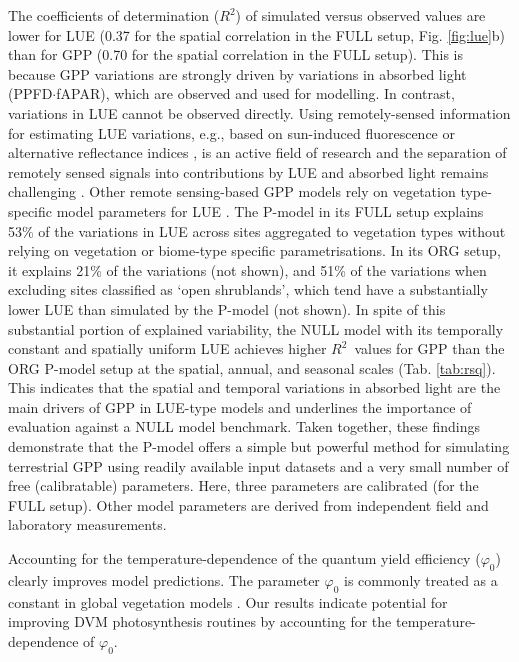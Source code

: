 \documentclass{myreport}
\newcommand{\rsq}{$R^2$}
\begin{document}
The coefficients of determination (\rsq ) of simulated versus observed values are lower for LUE (0.37 for the spatial correlation in the FULL setup, Fig. \ref{fig:lue}b) than for GPP (0.70 for the spatial correlation in the FULL setup). This is because GPP variations are strongly driven by variations in absorbed light (PPFD$\cdot$fAPAR), which are observed and used for modelling. In contrast, variations in LUE cannot be observed directly. Using remotely-sensed information for estimating LUE variations, e.g., based on sun-induced fluorescence \citep{frankenberg18, li18gcb, ryu19rse} or alternative reflectance indices \citep{gamon92, gamon16pnas, Badgley2017-tw}, is an active field of research and the separation of remotely sensed signals into contributions by LUE and absorbed light remains challenging \citep{porcarcastell14, ryu19rse}. Other remote sensing-based GPP models rely on vegetation type-specific model parameters for LUE \citep{Zhang2017-yr, running04, jiang16rse}. The P-model in its FULL setup explains 53\% of the variations in LUE across sites aggregated to vegetation types without relying on vegetation or biome-type specific parametrisations. In its ORG setup, it explains 21\% of the variations (not shown), and 51\% of the variations when excluding sites classified as `open shrublands', which tend have a substantially lower LUE than simulated by the P-model (not shown). In spite of this substantial portion of explained variability, the NULL model with its temporally constant and spatially uniform LUE achieves higher \rsq\ values for GPP than the ORG P-model setup at the spatial, annual, and seasonal scales (Tab. \ref{tab:rsq}). This indicates that the spatial and temporal variations in absorbed light are the main drivers of GPP in LUE-type models and underlines the importance of evaluation against a NULL model benchmark. Taken together, these findings demonstrate that the P-model offers a simple but powerful method for simulating terrestrial GPP using readily available input datasets and a very small number of free (calibratable) parameters. Here, three parameters are calibrated (for the FULL setup). Other model parameters are derived from independent field and laboratory measurements.


Accounting for the temperature-dependence of the quantum yield efficiency ($\varphi_0$) clearly improves model predictions. The parameter $\varphi_0$ is commonly treated as a constant in global vegetation models \citep{rogers17}. Our results indicate potential for improving DVM photosynthesis routines by accounting for the temperature-dependence of $\varphi_0$. 
\end{document}
